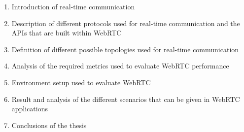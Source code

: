 \begin{enumerate}
\item Introduction of real-time communication
\item Description of different protocols used for real-time communication and the APIs that are built within WebRTC
\item Definition of different possible topologies used for real-time communication
\item Analysis of the required metrics used to evaluate WebRTC performance
\item Environment setup used to evaluate WebRTC 
\item Result and analysis of the different scenarios that can be given in WebRTC applications
\item Conclusions of the thesis
\end{enumerate}
